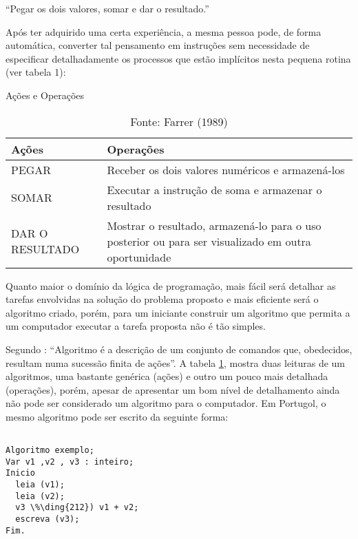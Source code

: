 ``Pegar os dois valores, somar e dar o resultado.''

Após ter adquirido uma certa experiência, a mesma pessoa pode, de forma
automática, converter tal pensamento em instruções sem necessidade de especificar
detalhadamente os processos que estão implícitos nesta pequena rotina (ver tabela 1):

\begin{table} [!htb]
  \caption{Ações e Operações}\label{tab:action+operation}
  \centering
  \begin{tabular}{ m{2.4cm} | m{10.9cm} }\hline
  \bfseries Ações & \bfseries Operações \\ \hline
  \MakeTextUppercase{Pegar} & Receber os dois valores numéricos e armazená-los \\ \hline
  \MakeTextUppercase{Somar} & Executar a instrução de soma e armazenar o resultado \\ \hline
  \MakeUppercase{Dar o \mbox{Resultado}} & Mostrar o resultado, armazená-lo para o uso
  posterior ou para ser visualizado em outra oportunidade \\
  \hline
  \end{tabular}
  \caption*{\footnotesize Fonte: Farrer (1989)}
\end{table}

Quanto maior o domínio da lógica de programação, mais fácil será detalhar as
tarefas envolvidas na solução do problema proposto e mais eficiente será o
algoritmo criado, porém, para um iniciante construir um algoritmo que permita
a um computador executar a tarefa proposta não é tão simples.

Segundo \cite[p. 17]{farreretal1989}: ``Algoritmo é a descrição de um conjunto de comandos que, obedecidos, resultam numa sucessão finita de ações''.
A tabela \ref{tab:action+operation}, mostra duas leituras de um algoritmos, uma bastante genérica (ações) e outro um pouco mais detalhada (operações), porém, apesar de apresentar um bom nível de detalhamento ainda não pode ser considerado um algoritmo para o computador. Em Portugol, o mesmo algoritmo pode ser escrito da seguinte forma:



\begin{lstlisting}[]  % Start your code-block

Algoritmo exemplo;
Var v1 ,v2 , v3 : inteiro;
Inicio
  leia (v1);
  leia (v2);
  v3 \%\ding{212}) v1 + v2;
  escreva (v3);
Fim.
\end{lstlisting}
